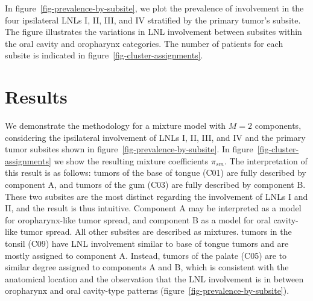 \documentclass[11pt,twocolumn,twoside]{article}
\begin{document}
In figure~\ref{fig-prevalence-by-subsite}, we plot the prevalence of
involvement in the four ipsilateral LNLs I, II, III, and IV stratified
by the primary tumor's subsite. The figure illustrates the variations in
LNL involvement between subsites within the oral cavity and oropharynx
categories. The number of patients for each subsite is indicated in
figure~\ref{fig-cluster-assignments}.

\section{Results}\label{sec-results}

We demonstrate the methodology for a mixture model with \(M=2\)
components, considering the ipsilateral involvement of LNLs I, II, III,
and IV and the primary tumor subsites shown in
figure~\ref{fig-prevalence-by-subsite}. In
figure~\ref{fig-cluster-assignments} we show the resulting mixture
coefficients \(\pi_{sm}\). The interpretation of this result is as
follows: tumors of the base of tongue (C01) are fully described by
component A, and tumors of the gum (C03) are fully described by
component B. These two subsites are the most distinct regarding the
involvement of LNLs I and II, and the result is thus intuitive.
Component A may be interpreted as a model for oropharynx-like tumor
spread, and component B as a model for oral cavity-like tumor spread.
All other subsites are described as mixtures. tumors in the tonsil (C09)
have LNL involvement similar to base of tongue tumors and are mostly
assigned to component A. Instead, tumors of the palate (C05) are to
similar degree assigned to components A and B, which is consistent with
the anatomical location and the observation that the LNL involvement is
in between oropharynx and oral cavity-type patterns
(figure~\ref{fig-prevalence-by-subsite}).
\end{document}
